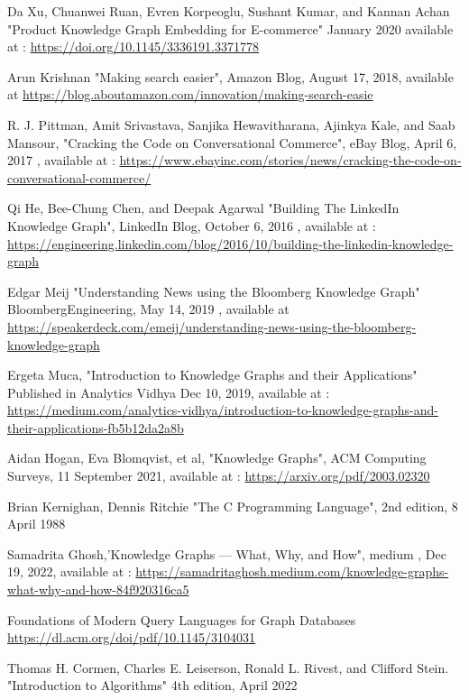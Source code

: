 \documentclass[conference]{IEEEtran}
\begin{document}
\begin{thebibliography}{00}

 Da Xu, Chuanwei Ruan, Evren Korpeoglu, Sushant Kumar, and Kannan Achan "Product Knowledge Graph Embedding for E-commerce"  January 2020 available at : \url{https://doi.org/10.1145/3336191.3371778}

 Arun Krishnan "Making search easier", Amazon Blog, August 17, 2018, available at \url{https://blog.aboutamazon.com/innovation/making-search-easie}

 R. J. Pittman, Amit Srivastava, Sanjika Hewavitharana, Ajinkya Kale, and Saab Mansour, "Cracking the Code on Conversational Commerce", eBay Blog,  April 6, 2017 , available at :  \url{https://www.ebayinc.com/stories/news/cracking-the-code-on-conversational-commerce/}

Qi He, Bee-Chung Chen, and Deepak Agarwal "Building The
LinkedIn Knowledge Graph", LinkedIn Blog,  October 6, 2016 , available at : \url{https://engineering.linkedin.com/blog/2016/10/building-the-linkedin-knowledge-graph}

 Edgar Meij "Understanding News using the Bloomberg Knowledge
Graph" BloombergEngineering, May 14, 2019 , available at 
\url{https://speakerdeck.com/emeij/understanding-news-using-the-bloomberg-knowledge-graph}

 Ergeta Muca, "Introduction to Knowledge Graphs and their Applications" Published in
Analytics Vidhya Dec 10, 2019, available 
at : \url{https://medium.com/analytics-vidhya/introduction-to-knowledge-graphs-and-their-applications-fb5b12da2a8b}

 Aidan Hogan, Eva Blomqvist, et al, "Knowledge Graphs", ACM
Computing Surveys, 11 September 2021,  available at : \url{https://arxiv.org/pdf/2003.02320}

 Brian Kernighan, Dennis Ritchie "The C Programming Language", 2nd edition, 8 April 1988

 Samadrita Ghosh,'Knowledge Graphs — What, Why, and How", medium , Dec 19, 2022, available at : \url{https://samadritaghosh.medium.com/knowledge-graphs-what-why-and-how-84f920316ca5}

 Foundations of Modern Query Languages for Graph
Databases \url{https://dl.acm.org/doi/pdf/10.1145/3104031}

 Thomas H. Cormen, Charles E. Leiserson, Ronald L. Rivest, and Clifford Stein. "Introduction to Algorithms" 4th edition, April 2022


\end{thebibliography}
\end{document}
